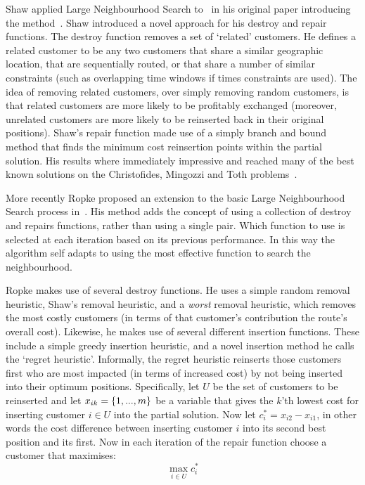 Shaw applied Large Neighbourhood Search to \VRP\ in his original paper introducing the method~\cite{Shaw:1998}. Shaw introduced a novel approach for his destroy and repair functions. The destroy function removes a set of `related' customers. He defines a related customer to be any two customers that share a similar geographic location, that are sequentially routed, or that share a number of similar constraints (such as overlapping time windows if times constraints are used). The idea of removing related customers, over simply removing random customers, is that related customers are more likely to be profitably exchanged (moreover, unrelated customers are more likely to be reinserted back in their original positions). Shaw's repair function made use of a simply branch and bound method that finds the minimum cost reinsertion points within the partial solution. His results where immediately impressive and reached many of the best known solutions on the Christofides, Mingozzi and Toth problems~\cite{CMT:1981}.

More recently Ropke proposed an extension to the basic Large Neighbourhood Search process in~\cite{Ropke:2005}. His method adds the concept of using a collection of destroy and repairs functions, rather than using a single pair. Which function to use is selected at each iteration based on its previous performance. In this way the algorithm self adapts to using the most effective function to search the neighbourhood. 

Ropke makes use of several destroy functions. He uses a simple random removal heuristic, Shaw's removal heuristic, and a \emph{worst} removal heuristic, which removes the most costly customers (in terms of that customer's contribution the route's overall cost). Likewise, he makes use of several different insertion functions. These include a simple greedy insertion heuristic, and a novel insertion method he calls the `regret heuristic'. Informally, the regret heuristic reinserts those customers first who are most impacted (in terms of increased cost) by not being inserted into their optimum positions. Specifically, let $U$ be the set of customers to be reinserted and let $x_{ik} = \{1,...,m\}$ be a variable that gives the $k$'th lowest cost for inserting customer $i \in U$ into the partial solution. Now let $c_i^* = x_{i2} - x_{i1}$, in other words the cost difference between inserting customer $i$ into its second best position and its first. Now in each iteration of the repair function choose a customer that maximises:
\[
   \operatorname*{max}_{i \in U} c_i^*
\]

